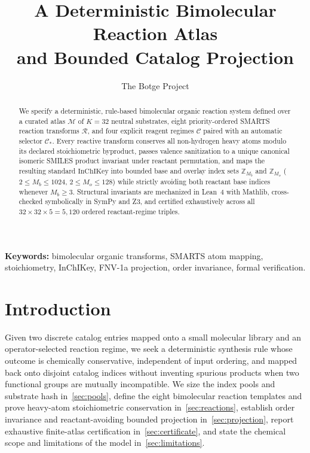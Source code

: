 \documentclass[11pt,a4paper]{article}
\title{%
  A Deterministic Bimolecular Reaction Atlas\\
  and Bounded Catalog Projection%
}
\author{The Botge Project}
\date{}
\theoremstyle{plain}
\theoremstyle{definition}
\theoremstyle{remark}
\newcommand{\Z}{\mathbb{Z}}
\newcommand{\Atlas}{\mathcal{M}}
\newcommand{\Reacts}{\mathcal{R}}
\newcommand{\Conds}{\mathcal{C}}
\begin{document}
\maketitle

\begin{abstract}
  We specify a deterministic, rule-based bimolecular organic reaction system defined over a
  curated atlas \( \Atlas \) of \( K = 32 \) neutral substrates, eight priority-ordered SMARTS
  reaction transforms \( \Reacts \), and four explicit reagent regimes \( \Conds \) paired with an
  automatic selector \( \Conds_* \). Every reactive transform conserves all non-hydrogen heavy
  atoms modulo its declared stoichiometric byproduct, passes valence sanitization to a unique
  canonical isomeric SMILES product invariant under reactant permutation, and maps the resulting
  standard \(\text{InChIKey}\) into bounded base and overlay index sets \( \Z_{M_b} \) and
  \( \Z_{M_o} \) (\( 2 \le M_b \le 1024 \), \( 2 \le M_o \le 128 \)) while strictly avoiding
  both reactant base indices whenever \( M_b \ge 3 \). Structural invariants are mechanized in
  Lean~4 with Mathlib, cross-checked symbolically in SymPy and Z3, and certified exhaustively
  across all \( 32 \times 32 \times 5 = 5{,}120 \) ordered reactant-regime triples.
\end{abstract}

\noindent\textbf{Keywords:} bimolecular organic transforms, SMARTS atom mapping, stoichiometry,
InChIKey, FNV-1a projection, order invariance, formal verification.

\section{Introduction}\label{sec:introduction}

Given two discrete catalog entries mapped onto a small molecular library and an operator-selected
reaction regime, we seek a deterministic synthesis rule whose outcome is chemically conservative,
independent of input ordering, and mapped back onto disjoint catalog indices without inventing
spurious products when two functional groups are mutually incompatible. We size the index pools and
substrate hash in~\cref{sec:pools}, define the eight bimolecular reaction templates and prove
heavy-atom stoichiometric conservation in~\cref{sec:reactions}, establish order invariance and
reactant-avoiding bounded projection in~\cref{sec:projection}, report exhaustive finite-atlas
certification in~\cref{sec:certificate}, and state the chemical scope and limitations of the model
in~\cref{sec:limitations}.
\end{document}
